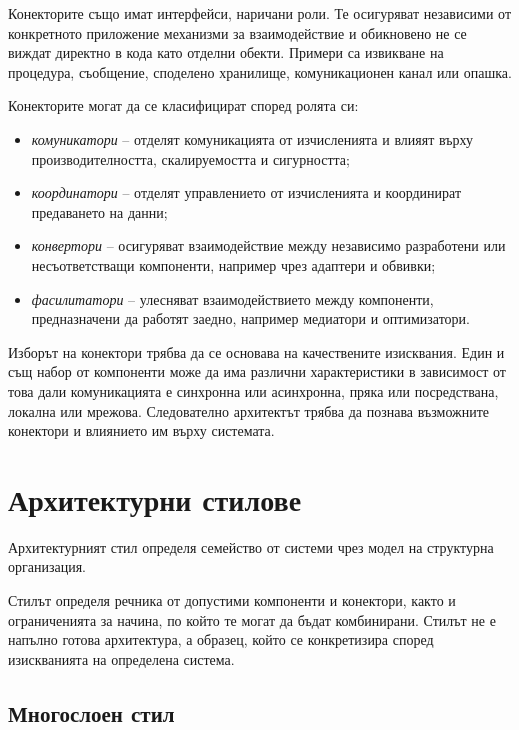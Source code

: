 Конекторите също имат интерфейси, наричани роли. Те осигуряват независими от конкретното приложение механизми за взаимодействие и обикновено не се виждат директно в кода като отделни обекти. Примери са извикване на процедура, съобщение, споделено хранилище, комуникационен канал или опашка.

Конекторите могат да се класифицират според ролята си:

\begin{itemize}
    \item \emph{комуникатори} -- отделят комуникацията от изчисленията и влияят върху производителността, скалируемостта и сигурността;
    \item \emph{координатори} -- отделят управлението от изчисленията и координират предаването на данни;
    \item \emph{конвертори} -- осигуряват взаимодействие между независимо разработени или несъответстващи компоненти, например чрез адаптери и обвивки;
    \item \emph{фасилитатори} -- улесняват взаимодействието между компоненти, предназначени да работят заедно, например медиатори и оптимизатори.
\end{itemize}

Изборът на конектори трябва да се основава на качествените изисквания. Един и същ набор от компоненти може да има различни характеристики в зависимост от това дали комуникацията е синхронна или асинхронна, пряка или посредствана, локална или мрежова. Следователно архитектът трябва да познава възможните конектори и влиянието им върху системата.

\section{Архитектурни стилове}\label{s:27.4}

\begin{defn}
Архитектурният стил определя семейство от системи чрез модел на структурна организация.
\end{defn}

Стилът определя речника от допустими компоненти и конектори, както и ограниченията за начина, по който те могат да бъдат комбинирани. Стилът не е напълно готова архитектура, а образец, който се конкретизира според изискванията на определена система.

\subsection{Многослоен стил}\label{s:27.4.1}

